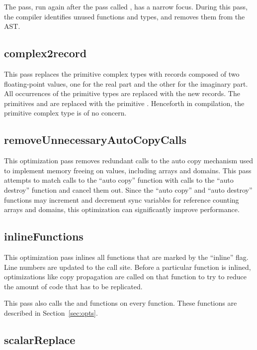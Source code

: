 \documentclass[10pt]{article}
\begin{document}
The  pass, run again after the pass called
, has a narrow focus.  During this pass, the
compiler identifies unused functions and types, and removes them from
the AST.

\subsection{complex2record}

This pass replaces the primitive complex types  with
records composed of two floating-point values, one for the real part
and the other for the imaginary part.  All occurrences of the
primitive types are replaced with the new records.  The primitives
 and  are replaced with the primitive
.  Henceforth in compilation, the primitive complex
type is of no concern.

\subsection{removeUnnecessaryAutoCopyCalls}

This optimization pass removes redundant calls to the auto copy
mechanism used to implement memory freeing on values, including arrays
and domains.  This pass attempts to match calls to the ``auto copy''
function with calls to the ``auto destroy'' function and cancel them
out.  Since the ``auto copy'' and ``auto destroy'' functions may
increment and decrement sync variables for reference counting arrays
and domains, this optimization can significantly improve performance.

\subsection{inlineFunctions}

This optimization pass inlines all functions that are marked by the
``inline'' flag.  Line numbers are updated to the call site.  Before a
particular function is inlined, optimizations like copy propagation
are called on that function to try to reduce the amount of code that
has to be replicated.

This pass also calls the  and
 functions on every function.  These
functions are described in Section~\ref{sec:opts}.

\subsection{scalarReplace}
\end{document}
